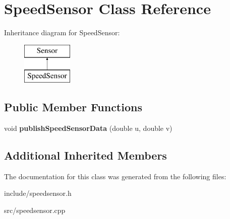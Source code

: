 \section{Speed\+Sensor Class Reference}
\label{class_speed_sensor}
Inheritance diagram for Speed\+Sensor\+:\begin{figure}[H]
\begin{center}
\leavevmode
\includegraphics[height=2.000000cm]{class_speed_sensor}
\end{center}
\end{figure}
\subsection*{Public Member Functions}
\begin{DoxyCompactItemize}
\item 
void {\bfseries publish\+Speed\+Sensor\+Data} (double u, double v)\label{class_speed_sensor_ae141c26517458aac01a12281a7f6b96f}

\end{DoxyCompactItemize}
\subsection*{Additional Inherited Members}


The documentation for this class was generated from the following files\+:\begin{DoxyCompactItemize}
\item 
include/speedsensor.\+h\item 
src/speedsensor.\+cpp\end{DoxyCompactItemize}
